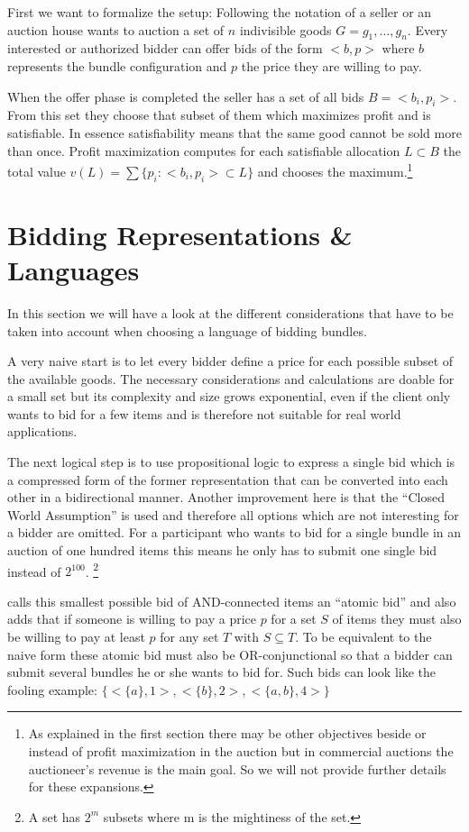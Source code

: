 \documentclass[a4paper]{paper}
\begin{document}
First we want to formalize the setup: Following the notation of \cite[chapter~2]{BH01} a seller or an auction house wants to auction a set of $n$ indivisible goods $G = {g_1, ..., g_n}$. Every interested or authorized bidder can offer bids of the form $<b, p>$ where $b$ represents the bundle configuration and $p$ the price they are willing to pay.

When the offer phase is completed the seller has a set of all bids $B = {<b_i,p_i>}$. From this set they choose that subset of them which maximizes profit and is satisfiable. In essence satisfiability means that the same good cannot be sold more than once. Profit maximization computes for each satisfiable allocation $L \subset B$ the total value $v(L) = \sum \{p_i : <b_i,p_i> \subset L\}$ and chooses the maximum.\footnote{As explained in the first section there may be other objectives beside or instead of profit maximization in the auction but in commercial auctions the auctioneer's revenue is the main goal. So we will not provide further details for these expansions.}

\section{Bidding Representations \& Languages}

In this section we will have a look at the different considerations that have to be taken into account when choosing a language of bidding bundles. 

A very naive start is to let every bidder define a price for each possible subset of the available goods. The necessary considerations and calculations are doable for a small set but its complexity and size grows exponential, even if the client only wants to bid for a few items and is therefore not suitable for real world applications.

The next logical step is to use propositional logic to express a single bid which is a compressed form of the former representation that can be converted into each other in a bidirectional manner. Another improvement here is that the ``Closed World Assumption'' is used and therefore all options which are not interesting for a bidder are omitted. For a participant who wants to bid for a single bundle in an auction of one hundred items this means he only has to submit one single bid instead of $2^{100}$. \footnote{A set has $2^m$ subsets where m is the mightiness of the set.}

\cite{Nis00} calls this smallest possible bid of AND-connected items an ``atomic bid'' and also adds that if someone is willing to pay a price $p$ for a set $S$ of items they must also be willing to pay at least $p$ for any set $T$ with $S \subseteq T$. To be equivalent to the naive form these atomic bid must also be OR-conjunctional so that a bidder can submit several bundles he or she wants to bid for. Such bids can look like the fooling example: $\{<\{a\},1>,<\{b\},2>,<\{a,b\},4>\}$
\end{document}
